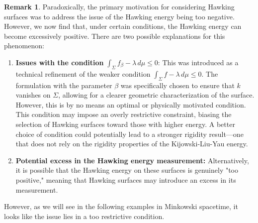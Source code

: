 \documentclass[12pt,a4paper]{amsart}
\theoremstyle{plain}
\theoremstyle{definition}
\newtheorem{remark}[theorem]{Remark}
\begin{document}
\begin{remark}\label{tooposi} Paradoxically, the primary motivation for considering Hawking surfaces was to address the issue of the Hawking energy being too negative. However, we now find that, under certain conditions, the Hawking energy can become excessively positive. There are two possible explanations for this phenomenon:

\begin{enumerate}
    \item \textbf{Issues with the condition} \( \int_\Sigma f_\beta -\lambda \, d\mu \leq 0 \):  
    This was introduced as a technical refinement of the weaker condition \( \int_\Sigma f -\lambda \, d\mu \leq 0 \). The formulation with the parameter \( \beta \) was specifically chosen to ensure that \( k \) vanishes on \( \Sigma \), allowing for a clearer geometric characterization of the surface. However, this is by no means an optimal or physically motivated condition. This condition may impose an overly restrictive constraint, biasing the selection of Hawking surfaces toward those with higher energy. A better choice of condition could potentially lead to a stronger rigidity result—one that does not rely on the rigidity properties of the Kijowski-Liu-Yau energy.

    \item \textbf{Potential excess in the Hawking energy measurement:}  
    Alternatively, it is possible that the Hawking energy on these surfaces is genuinely "too positive," meaning that Hawking surfaces may introduce an excess in its measurement.    
\end{enumerate}
However, as we will see in the following examples in Minkowski spacetime, it looks like the issue lies in a too restrictive condition.
\end{remark}
\end{document}
